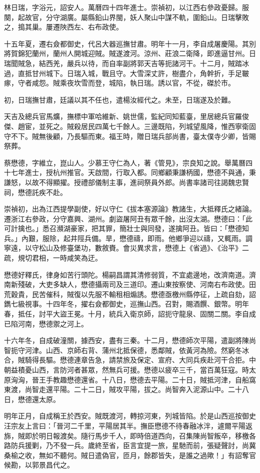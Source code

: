 \begin{pinyinscope}
{{林日瑞，字浴元，詔安人。萬曆四十四年進士。崇禎初，以江西右參政憂歸。服闋，起故官，分守湖廣。屬縣鉛山界閩，妖人聚山中謀不軌，圍鉛山。日瑞擊敗之，搗其巢。屢遷陜西左、右布政使。

十五年夏，遷右僉都御史，代呂大器巡撫甘肅。明年十一月，李自成屠慶陽。其別將賀錦犯蘭州，蘭州人開城迎賊。賊遂渡河。涼州、莊浪二衛降，即進逼甘州。日瑞聞賊急，結西羌，嚴兵以待，而自率副將郭天吉等扼諸河干。十二月，賊踏冰過，直抵甘州城下。日瑞入城，戰且守。大雪深丈許，樹盡介，角幹折，手足皸瘃，守者咸怨。賊乘夜坎雪而登，城陷，執日瑞。誘以官，不從，磔於市。

初，日瑞撫甘肅，廷議以其不任也，遣楊汝經代之。未至，日瑞遂及於難。

天吉及總兵官馬爌，撫標中軍哈維新、姚世儒，監紀同知藍臺，里居總兵官羅俊傑、趙宦，並死之。賊殺居民四萬七千餘人。三邊既陷，列城望風降，惟西寧衛固守不下。賊無後顧，乃長驅而東。福王時，贈日瑞兵部尚書，臺太僕寺少卿，皆賜祭葬。

蔡懋德，字維立，崑山人。少慕王守仁為人，著《管見》，宗良知之說。舉萬曆四十七年進士，授杭州推官。天啟間，行取入都。同鄉顧秉謙柄國，懋德不與通，秉謙怒，以故不得顯擢。授禮部儀制主事，進祠祭員外郎。尚書率諸司往謁魏忠賢祠，懋德託疾不赴。

崇禎初，出為江西提學副使，好以守仁《拔本塞源論》教諸生，大抵釋氏之緒論。遷浙江右參政，分守嘉興、湖州。劇盜屠阿丑有眾千餘，出沒太湖。懋德曰：「此可計擒也。」悉召瀕湖豪家，把其罪，簡壯士與同發，遂擒阿丑。皆曰：「懋德知兵。」內艱，服除，起井陘兵備。旱，懋德禱，即雨。他鄉爭迎以禱，又輒雨。調寧遠，以守松山及修臺堡功，數敘賚。會災異求言，懋德上《省過》、《治平》二疏，規切君相，一時咸笑為迂。

懋德好釋氏，律身如苦行頭陀。楊嗣昌謂其清修弱質，不宜處邊地，改濟南道。濟南新殘破，大吏多缺人，懋德攝兩司及三道印。遷山東按察使、河南右布政使。田荒穀貴，民苦催科，賊復以先服不輸租相煽誘。懋德亟檄州縣停征，上疏自劾，詔鐫七級視事。十四年冬，擢右僉都御史，巡撫山西。召對，賜酒饌、銀幣。明年春，抵任，討平大盜王冕。十月，統兵入衛京師，詔扼守龍泉、固關二關。李自成已陷河南，懋德禦之河上。

十六年冬，自成破潼關，據西安，盡有三秦。十二月，懋德師次平陽，遣副將陳尚智扼守河津。山西、京師右背、蒲州北抵保德，悉鄰賊，依黃河為險。然窮冬冰合，賊騎得長驅。懋德連章告急，請禁旅及保定、宣府、大同兵疾赴河干合拒。中朝益積憂山西，言防河者甚眾，然無兵可援。懋德以疲卒三千，當百萬狂寇。時太原洶洶，晉王手教趣懋德還省。十八日，懋德去平陽。二十日，賊抵河津，自船窩東渡，尚智走還平陽。二十二日，賊攻平陽，拔之。尚智奔入泥源山中。二十八日，懋德還太原。

明年正月，自成稱王於西安。賊既渡河，轉掠河東，列城皆陷。於是山西巡按御史汪宗友上言曰：「晉河二千里，平陽居其半。撫臣懋德不待春融冰泮，遽爾平陽返旆，賊即於明日報渡矣。隨行馬步千人，即時倍道西向，召集陳尚智叛卒，移檄各路防兵援剿，乃不發一兵。歲終至省，臣言宜提一旅，星馳而前，張疑聲討，尚冀桑榆之收，無如不聽何。賊日遣偽官，匝月，餘郡皆失，是誰之過歟！」有詔奪官候勘，以郭景昌代之。

}}
\end{pinyinscope}
